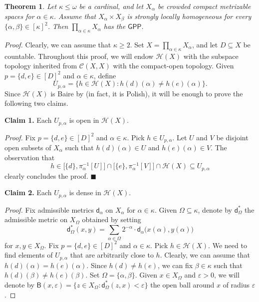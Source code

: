 \documentclass{amsart}
\theoremstyle{plain}
\newtheorem{theorem}{Theorem}[section]
\theoremstyle{definition}
\newcommand{\di}{\mathsf{d}}
\newcommand{\Ball}{\mathsf{B}}
\newcommand{\GPP}{\mathsf{GPP}}
\newcommand{\CC}{\mathcal{C}}
\newcommand{\HH}{\mathcal{H}}
\begin{document}
\begin{theorem}\label{theorem_gpp_compact}
Let $\kappa\leq\omega$ be a cardinal, and let $X_\alpha$ be crowded compact metrizable spaces for $\alpha\in\kappa$. Assume that $X_\alpha\times X_\beta$ is strongly locally homogeneous for every $\{\alpha,\beta\}\in [\kappa]^2$. Then $\prod_{\alpha\in\kappa}X_\alpha$ has the $\GPP$.
\end{theorem}
\begin{proof}
Clearly, we can assume that $\kappa\geq 2$. Set $X=\prod_{\alpha\in\kappa}X_\alpha$, and let $D\subseteq X$ be countable. Throughout this proof, we will endow $\HH(X)$ with the subspace topology inherited from $\CC(X,X)$ with the compact-open topology. Given $p=\{d,e\}\in [D]^2$ and $\alpha\in\kappa$, define
$$
U_{p,\alpha}=\{h\in\HH(X):h(d)(\alpha)\neq h(e)(\alpha)\}.
$$
Since $\HH(X)$ is Baire by \cite[Corollary 1.3.13]{van_mill_book} (in fact, it is Polish), it will be enough to prove the following two claims.

\noindent\textbf{Claim 1.} Each $U_{p,\alpha}$ is open in $\HH(X)$.

\noindent\textit{Proof.} Fix $p=\{d,e\}\in [D]^2$ and $\alpha\in\kappa$. Pick $h\in U_{p,\alpha}$. Let $U$ and $V$ be disjoint open subsets of $X_\alpha$ such that $h(d)(\alpha)\in U$ and $h(e)(\alpha)\in V$. The observation that
$$
h\in\big[\{d\},\pi^{-1}_\alpha[U]\big]\cap\big[\{e\},\pi^{-1}_\alpha[V]\big]\cap\HH(X)\subseteq U_{p,\alpha}
$$
clearly concludes the proof. $\blacksquare$

\noindent\textbf{Claim 2.} Each $U_{p,\alpha}$ is dense in $\HH(X)$.

\noindent\textit{Proof.} Fix admissible metrics $\di_\alpha$ on $X_\alpha$ for $\alpha\in\kappa$. Given $\Omega\subseteq\kappa$, denote by $\di^\ast_\Omega$ the admissible metric on $X_\Omega$ obtained by setting
$$
\di^\ast_\Omega(x,y)=\sum_{\alpha\in\Omega}2^{-\alpha}\cdot\di_\alpha\big(x(\alpha),y(\alpha)\big)
$$
for $x,y\in X_\Omega$. Fix $p=\{d,e\}\in [D]^2$ and $\alpha\in\kappa$. Pick $h\in\HH(X)$. We need to find elements of $U_{p,\alpha}$ that are arbitrarily close to $h$. Clearly, we can assume that $h(d)(\alpha)=h(e)(\alpha)$. Since $h(d)\neq h(e)$, we can fix $\beta\in\kappa$ such that $h(d)(\beta)\neq h(e)(\beta)$. Set $\Omega=\{\alpha,\beta\}$. Given $x\in X_\Omega$ and $\varepsilon>0$, we will denote by $\Ball(x,\varepsilon)=\{z\in X_\Omega:\di^\ast_\Omega(z,x)<\varepsilon\}$ the open ball around $x$ of radius $\varepsilon$.


\end{proof}
\end{document}

